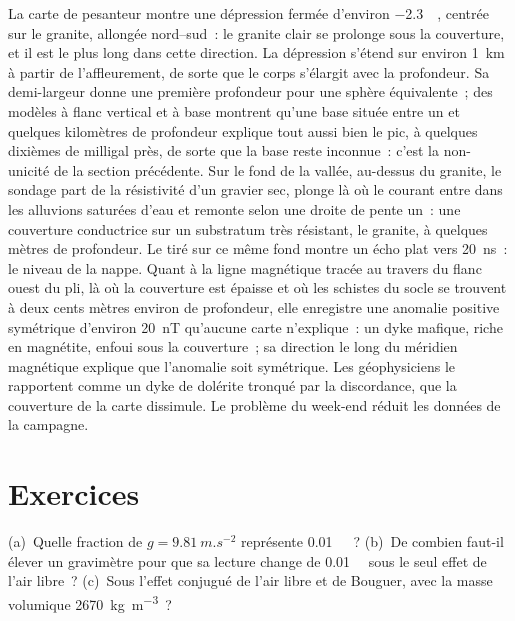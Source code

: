 \begin{example}\label{ex:b3:field-lab-methods-3:varden}
La carte de pesanteur montre une dépression fermée d'environ \qty{-2.3}{\milli\gal},
centrée sur le granite, allongée nord--sud~: le granite clair se prolonge sous la
couverture, et il est le plus long dans cette direction. La dépression s'étend sur
environ \qty{1}{km} à partir de l'affleurement, de sorte que le corps s'élargit
avec la profondeur. Sa demi-largeur donne une première profondeur pour une sphère
équivalente~; des modèles à flanc vertical et à base montrent qu'une base située
entre un et quelques kilomètres de profondeur explique tout aussi bien le pic, à
quelques dixièmes de milligal près, de sorte que la base reste inconnue~: c'est la
non-unicité de la section précédente. Sur le fond de la vallée, au-dessus du granite,
le sondage part de la résistivité d'un gravier sec, plonge là où le courant entre
dans les alluvions saturées d'eau et remonte selon une droite de pente un~: une
couverture conductrice sur un substratum très résistant, le granite, à quelques
mètres de profondeur. Le  tiré sur ce même fond montre un écho plat vers
\qty{20}{ns}~: le niveau de la nappe. Quant à la ligne magnétique tracée au travers
du flanc ouest du pli, là où la couverture est épaisse et où les schistes du
socle se trouvent à deux cents mètres environ de profondeur, elle enregistre une
anomalie positive symétrique d'environ \qty{20}{nT} qu'aucune carte n'explique~: un
dyke mafique, riche en magnétite, enfoui sous la couverture~; sa direction le long
du méridien magnétique explique que l'anomalie soit symétrique. Les géophysiciens
le rapportent comme un dyke de dolérite tronqué par la discordance, que la
couverture de la carte dissimule. Le problème du week-end réduit les données de la
campagne.
\end{example}

\section{Exercices}

\begin{exercise}[$\star$]\label{exo:b3:field-lab-methods-3:1}
(a)~Quelle fraction de $g = \qty{9.81}{m.s^{-2}}$ représente \qty{0.01}{\milli\gal}~?
(b)~De combien faut-il élever un gravimètre pour que sa lecture change
de \qty{0.01}{\milli\gal} sous le seul effet de l'air libre~? (c)~Sous l'effet conjugué
de l'air libre et de Bouguer, avec la masse volumique
\qty{2670}{kg.m^{-3}}~?
\end{exercise}

